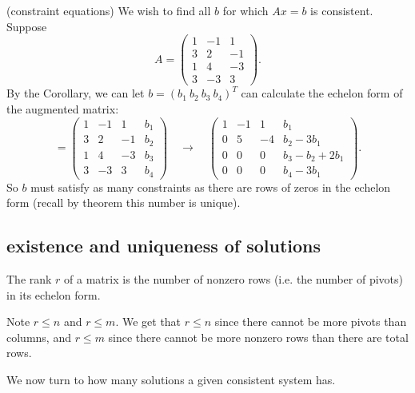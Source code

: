 \documentclass[12pt]{article}
\begin{document}
\begin{example}
	(constraint equations) We wish to find all $b$ for which $Ax=b$ is consistent. Suppose 
	\begin{equation*}
		A = \begin{pmatrix} 1 & -1 & 1 \\ 3&2&-1 \\ 1&4&-3 \\ 3&-3&3 \end{pmatrix}.
	\end{equation*}
	By the Corollary, we can let $b=(b_1\ b_2\ b_3\ b_4)^T$ can calculate the echelon form of the augmented matrix:
	\begin{equation*}
		[A|b] = \begin{pmatrix} 1 & -1 & 1&b_1 \\ 3&2&-1&b_2 \\ 1&4&-3&b_3 \\ 3&-3&3&b_4 \end{pmatrix} \quad \to \quad \begin{pmatrix} 1 & -1 & 1&b_1 \\ 0&5&-4&b_2-3b_1 \\ 0&0&0&b_3-b_2+2b_1 \\ 0&0&0&b_4-3b_1 \end{pmatrix}.
	\end{equation*}
	So $b$ must satisfy as many constraints as there are rows of zeros in the echelon form (recall by theorem this number is unique).
\end{example}


\subsection{existence and uniqueness of solutions} %

\begin{definition}
	The rank $r$ of a matrix is the number of nonzero rows (i.e. the number of pivots) in its echelon form. 
\end{definition}

\begin{remark}
	Note $r\leq n$ and $r\leq m$. We get that $r\leq n$ since there cannot be more pivots than columns, and $r\leq m$ since there cannot be more nonzero rows than there are total rows.
\end{remark}

We now turn to how many solutions a given consistent system has.
\end{document}
